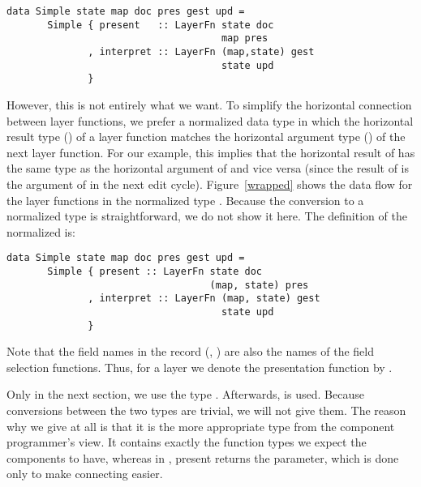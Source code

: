 \documentclass[preprint,natbib]{sigplanconf}
\begin{document}
\begin{small}
\begin{verbatim}
data Simple state map doc pres gest upd =
       Simple { present   :: LayerFn state doc 
                                     map pres
              , interpret :: LayerFn (map,state) gest
                                     state upd
              }
\end{verbatim}
\end{small}


However, this is not entirely what we want. To simplify the horizontal connection between layer functions, we prefer a normalized data type in which the horizontal result type () of a layer function matches the horizontal argument type () of the next layer function. For our example, this implies that the horizontal result of  has the same type as the horizontal argument of  and vice versa (since the result of  is the argument of  in the next edit cycle). Figure~\ref{wrapped} shows the data flow for the layer functions in the normalized type . Because the conversion to a normalized type is straightforward, we do not show it here. The definition of the normalized  is:

\begin{small}
\begin{verbatim}
data Simple state map doc pres gest upd =
       Simple { present :: LayerFn state doc 
                                   (map, state) pres
              , interpret :: LayerFn (map, state) gest
                                     state upd
              }
\end{verbatim}
\end{small}


Note that the field names in the record (, ) are also the names of the field selection functions. Thus, for a layer  we denote the presentation function by . 


\bc
Only in the next section, we use the type . Afterwards,  is used. Because conversions between the two types are trivial, we will not give them. The reason why we give  at all is that it is the more appropriate type from the component programmer's view. It contains exactly the function types we expect the components to have, whereas in , present returns the  parameter, which is done only to make connecting easier.
\ec
\end{document}
